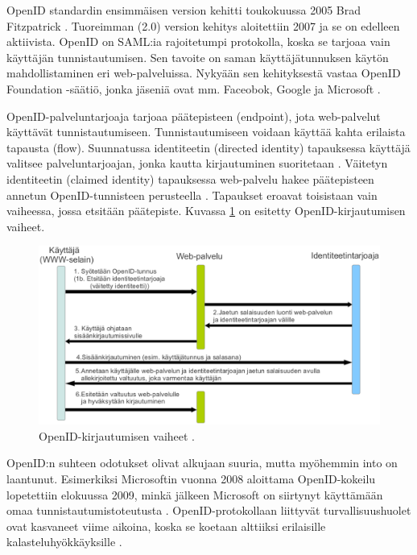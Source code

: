 OpenID standardin ensimmäisen version kehitti toukokuussa 2005 Brad Fitzpatrick \cite{openid}. Tuoreimman (2.0) version kehitys aloitettiin 2007 ja se on edelleen aktiivista. OpenID on SAML:ia rajoitetumpi protokolla, koska se tarjoaa vain käyttäjän tunnistautumisen. Sen tavoite on saman käyttäjätunnuksen käytön mahdollistaminen eri web-palveluissa. Nykyään sen kehityksestä vastaa \mbox{OpenID} Foundation -säätiö, jonka jäseniä ovat mm. Faceobok, Google ja Microsoft \cite{openid_foundation}.

OpenID-palveluntarjoaja tarjoaa päätepisteen (endpoint), jota web-palvelut käyttävät tunnistautumiseen. Tunnistautumiseen voidaan käyttää kahta erilaista tapausta (flow). Suunnatussa identiteetin (directed identity) tapauksessa käyttäjä valitsee palveluntarjoajan, jonka kautta kirjautuminen suoritetaan \cite{openid}. Väitetyn identiteetin (claimed identity) tapauksessa web-palvelu hakee päätepisteen annetun \mbox{OpenID}\--tun\-nis\-teen perusteella \cite{openid}. Tapaukset eroavat toisistaan vain vaiheessa, jossa etsitään päätepiste. Kuvassa \ref{openid_flow} on esitetty OpenID-kirjautumisen vaiheet.

\begin{figure}[ht]
\centering
\includegraphics[width=\textwidth]{teknologiat/protokollat/openid.eps}
\caption{OpenID-kirjautumisen vaiheet \cite{openid}.}%
\label{openid_flow}
\end{figure}

OpenID:n suhteen odotukset olivat alkujaan suuria, mutta myöhemmin into on laantunut. Esimerkiksi Microsoftin vuonna 2008 aloittama OpenID-kokeilu lopetettiin elokuussa 2009, minkä jälkeen Microsoft on siirtynyt käyttämään omaa tunnistautumistoteutusta \cite{openid_microsoft}. OpenID-protokollaan liittyvät turvallisuushuolet ovat kasvaneet viime aikoina, koska se koetaan alttiiksi erilaisille kalasteluhyökkäyksille \cite{billion_keys}.


